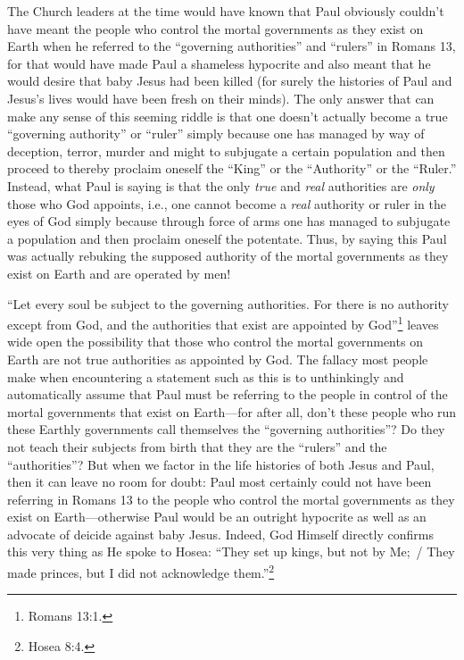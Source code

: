 \documentclass[letterpaper,12pt]{article}
\begin{document}
The Church leaders at the time would have known that Paul obviously couldn't have meant the people who control the mortal governments as they exist on Earth when he referred to the ``governing authorities'' and ``rulers'' in Romans 13, for that would have made Paul a shameless hypocrite and also meant that he would desire that baby Jesus had been killed (for surely the histories of Paul and Jesus's lives would have been fresh on their minds). The only answer that can make any sense of this seeming riddle is that one doesn't actually become a true ``governing authority'' or ``ruler'' simply because one has managed by way of deception, terror, murder and might to subjugate a certain population and then proceed to thereby proclaim oneself the ``King'' or the ``Authority'' or the ``Ruler.'' Instead, what Paul is saying is that the only \emph{true} and \emph{real} authorities are \emph{only} those who God appoints, i.e., one cannot become a \emph{real} authority or ruler in the eyes of God simply because through force of arms one has managed to subjugate a population and then proclaim oneself the potentate. Thus, by saying this Paul was actually rebuking the supposed authority of the mortal governments as they exist on Earth and are operated by men!

``Let every soul be subject to the governing authorities. For there is no authority except from God, and the authorities that exist are appointed by God''\footnote{Romans 13:1.} leaves wide open the possibility that those who control the mortal governments on Earth are not true authorities as appointed by God. The fallacy most people make when encountering a statement such as this is to unthinkingly and automatically assume that Paul must be referring to the people in control of the mortal governments that exist on Earth---for after all, don't these people who run these Earthly governments call themselves the ``governing authorities''? Do they not teach their subjects from birth that they are the ``rulers'' and the ``authorities''? But when we factor in the life histories of both Jesus and Paul, then it can leave no room for doubt: Paul most certainly could not have been referring in Romans 13 to the people who control the mortal governments as they exist on Earth---otherwise Paul would be an outright hypocrite as well as an advocate of deicide against baby Jesus. Indeed, God Himself directly confirms this very thing as He spoke to Hosea: ``They set up kings, but not by Me;~/ They made princes, but I did not acknowledge them.''\footnote{Hosea 8:4.}
\end{document}
